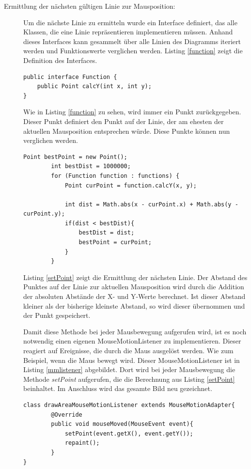 \begin{description}
\item[Ermittlung der nächsten gültigen Linie zur Mausposition:] Um die nächste Linie zu ermitteln wurde ein Interface definiert, das alle Klassen, die eine Linie repräsentieren implementieren müssen. Anhand dieses Interfaces kann gesammelt über alle Linien des Diagramms iteriert werden und Funktionswerte verglichen werden. Listing \ref{function} zeigt die Definition des Interfaces.
\begin{lstlisting}[captionpos=b, caption=Interface für die Linien, label=function]
public interface Function {
    public Point calcY(int x, int y);
}
\end{lstlisting}

Wie in Listing \ref{function} zu sehen, wird immer ein Punkt zurückgegeben. Dieser Punkt definiert den Punkt auf der Linie, der am ehesten der aktuellen Mausposition entsprechen würde. Diese Punkte können nun verglichen werden.
\begin{lstlisting}[captionpos=b, caption=Methode zum ermitteln des nächsten Punktes, label=setPoint]
Point bestPoint = new Point();
        int bestDist = 1000000;
        for (Function function : functions) {
            Point curPoint = function.calcY(x, y);

            int dist = Math.abs(x - curPoint.x) + Math.abs(y -curPoint.y);
            if(dist < bestDist){
                bestDist = dist;
                bestPoint = curPoint;
            }
        }
\end{lstlisting}

Listing \ref{setPoint} zeigt die Ermittlung der nächsten Linie. Der Abstand des Punktes auf der Linie zur aktuellen Mausposition wird durch die Addition der absoluten Abstände der X- und Y-Werte berechnet. Ist dieser Abstand kleiner als der bisherige kleinste Abstand, so wird dieser übernommen und der Punkt gespeichert. 

Damit diese Methode bei jeder Mausbewegung aufgerufen wird, ist es noch notwendig einen eigenen MouseMotionListener zu implementieren. Dieser reagiert auf Ereignisse, die durch die Maus ausgelöst werden. Wie zum Beispiel, wenn die Maus bewegt wird. Dieser MouseMotionListener ist in Listing \ref{mmlistener} abgebildet. Dort wird bei jeder Mausbewegung die Methode \emph{setPoint} aufgerufen, die die Berechnung aus Listing \ref{setPoint} beinhaltet. Im Anschluss wird das gesamte Bild neu gezeichnet.
\begin{lstlisting}[captionpos=b, caption=MouseMotionListener, label=mmlistener]
class drawAreaMouseMotionListener extends MouseMotionAdapter{
        @Override
        public void mouseMoved(MouseEvent event){
            setPoint(event.getX(), event.getY());
            repaint();
        }
}
\end{lstlisting}


\end{description}
